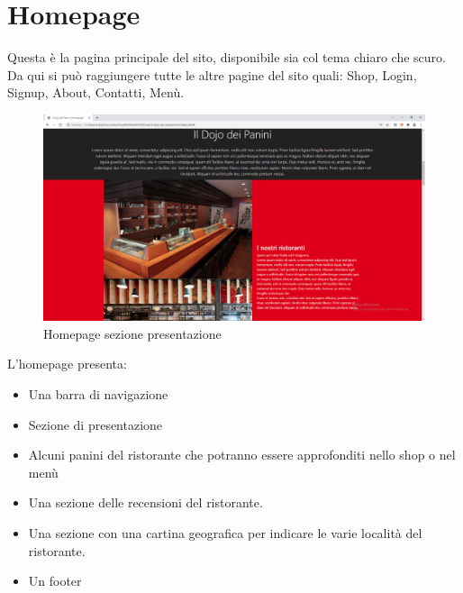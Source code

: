 \documentclass[a4paper,12pt]{report}
\begin{document}
	\section{Homepage}
	
	\textsf{\small Questa è la pagina principale del sito, disponibile sia col tema chiaro che scuro. Da qui si può raggiungere tutte le altre pagine del sito quali: Shop, Login, Signup, About, Contatti, Menù.}\\
	
	\begin{figure}[ht] 
		\centering
		\includegraphics[width=1\textwidth, height=1\textheight, keepaspectratio]{./Images/Homepage_presentazione.png}
		\caption{Homepage sezione presentazione}
		\label{fig:homepage_presentazione}
	\end{figure}
	
	\textsf{\small L'homepage presenta: }
	
	\begin{itemize}
		\item \textsf{\small Una barra di navigazione}
		\item \textsf{\small Sezione di presentazione}
		\item \textsf{\small Alcuni panini del ristorante che potranno essere approfonditi nello shop o nel menù}
		\item \textsf{\small Una sezione delle recensioni del ristorante.}
		\item \textsf{\small Una sezione con una cartina geografica per indicare le varie località del ristorante.}
		\item \textsf{\small Un footer}
	\end{itemize}
\end{document}
